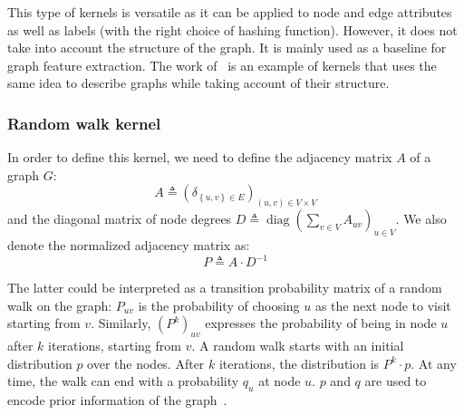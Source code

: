                 This type of kernels is versatile as it can be applied to node and edge attributes as well as labels (with the right choice of hashing function).
                However, it does not take into account the structure of the graph.
                It is mainly used as a baseline for graph feature extraction.
                The work of~\textcite{shervashidze2011weisfeiler} is an example of kernels that uses the same idea to describe graphs while taking account of their structure.

            \subsubsection{Random walk kernel}
                In order to define this kernel, we need to define the adjacency matrix $A$ of a graph $G$:
                \begin{equation}
                    \label{eq::adjacency_matrix}
                    A \triangleq \left(\delta_{\left\{u,v\right\}\in E}\right)_{(u, v) \in V\times V}
                \end{equation}
                and the diagonal matrix of node degrees $D\triangleq \operatorname{diag}\left(\sum_{v \in V}A_{uv}\right)_{u \in V}$.
                We also denote the normalized adjacency matrix as:
                \begin{equation}
                    \label{eq::normalized_adjacency_matrix}
                    P \triangleq A\cdot D^{-1}
                \end{equation}

                The latter could be interpreted as a transition probability matrix of a random walk on the graph:
                $P_{uv}$ is the probability of choosing $u$ as the next node to visit starting from $v$.
                Similarly, $\left(P^k\right)_{uv}$ expresses the probability of being in node $u$ after $k$ iterations, starting from $v$.
                A random walk starts with an initial distribution $p$ over the nodes.
                After $k$ iterations, the distribution is $P^k\cdot p$.
                At any time, the walk can end with a probability $q_u$ at node $u$.
                $p$ and $q$ are used to encode prior information of the graph~\parencite{vishwanathan2010graph}.\\
                

